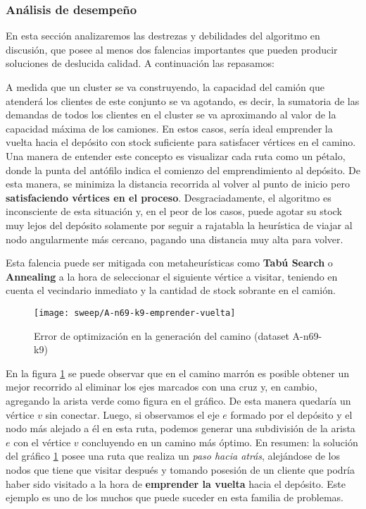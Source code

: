 \subsubsection{Análisis de desempeño}
En esta sección analizaremos las destrezas y debilidades del algoritmo en discusión, que posee al menos dos falencias importantes que pueden producir soluciones de deslucida calidad. A continuación las repasamos:

A medida que un cluster se va construyendo, la capacidad del camión que atenderá los clientes de este conjunto se va agotando, es decir, la sumatoria de las demandas de todos los clientes en el cluster se va aproximando al valor de la capacidad máxima de los camiones. En estos casos, sería ideal emprender la vuelta hacia el depósito con stock suficiente para satisfacer vértices en el camino. Una manera de entender este concepto es visualizar cada ruta como un pétalo, donde la punta del antófilo indica el comienzo del emprendimiento al depósito. De esta manera, se minimiza la distancia recorrida al volver al punto de inicio pero \textbf{satisfaciendo vértices en el proceso}. Desgraciadamente, el algoritmo es inconsciente de esta situación y, en el peor de los casos, puede agotar su stock muy lejos del depósito solamente por seguir a rajatabla la heurística de viajar al nodo angularmente más cercano, pagando una distancia muy alta para volver.

\vskip 8pt

Esta falencia puede ser mitigada con metaheurísticas como \textbf{Tabú Search} o \textbf{Annealing} a la hora de seleccionar el siguiente vértice a visitar, teniendo en cuenta el vecindario inmediato y la cantidad de stock sobrante en el camión.

\begin{figure}[H]
	\centering
	\texttt{[image: sweep/A-n69-k9-emprender-vuelta]}
	\caption{\footnotesize Error de optimización en la generación del camino (dataset A-n69-k9)}
	\label{fig:sweep-emprender-vuelta}
\end{figure}

En la figura \ref{fig:sweep-emprender-vuelta} se puede observar que en el camino marrón es posible obtener un mejor recorrido al eliminar los ejes marcados con una cruz y, en cambio, agregando la arista verde como figura en el gráfico. De esta manera quedaría un vértice $v$ sin conectar. Luego, si observamos el eje $e$ formado por el depósito y el nodo más alejado a él en esta ruta, podemos generar una subdivisión de la arista $e$ con el vértice $v$ concluyendo en un camino más óptimo. En resumen: la solución del gráfico \ref{fig:sweep-emprender-vuelta} posee una ruta que realiza un \textit{paso hacia atrás}, alejándose de los nodos que tiene que visitar después y tomando posesión de un cliente que podría haber sido visitado a la hora de \textbf{emprender la vuelta} hacia el depósito. Este ejemplo es uno de los muchos que puede suceder en esta familia de problemas.

